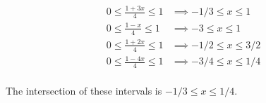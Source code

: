\documentclass[10pt, oneside]{article}
\begin{document}
\begin{enumerate}[label=4.\arabic*]
\begin{align*}
0 \leq \frac{1 + 3x}{4} \leq 1 &\implies -1/3 \leq x \leq 1 \\
0 \leq \frac{1 - x}{4} \leq 1 &\implies -3 \leq x \leq 1 \\
0 \leq \frac{1 + 2x}{4} \leq 1 &\implies -1/2 \leq x \leq 3/2 \\
0 \leq \frac{1 - 4x}{4} \leq 1 &\implies -3/4 \leq x \leq 1/4 \\
\end{align*}

The intersection of these intervals is $\boxed{-1/3 \leq x \leq 1/4}$.

\end{enumerate}
\end{document}

